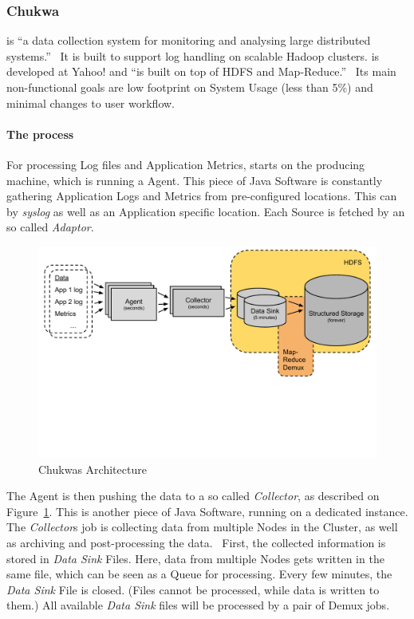 \subsubsection{Chukwa}
\chuklong is ``a data collection system for monitoring and analysing large distributed systems.''~\cite{Boulona}
It is built to support log handling on scalable Hadoop clusters. \chuk is developed at Yahoo! and ``is built on top of HDFS and Map-Reduce.''~\cite{Rabkin2008a}
Its main non-functional goals are low footprint on System Usage (less than 5\%) and minimal changes to user workflow.~\cite{Rabkin2010}

\paragraph{The process}
For processing Log files and Application Metrics, \chuk starts on the producing machine, which is running a \chuk Agent. 
This piece of Java Software is constantly gathering Application Logs and Metrics from pre-configured locations. 
This can by \textit{syslog} as well as an Application specific location. 
Each Source is fetched by an so called \textit{Adaptor}.~\cite{ChukwaAdminAgent}

\begin{figure}[hbt]
  \centering
  \includegraphics[width=\linewidth,clip=true,trim=0 6cm 0 0]{images/ChukwaArchitecture}
  \caption{Chukwas Architecture~\cite{Rabkin2008}}
  \label{fig:ChukwaArchitecture}
\end{figure}

The Agent is then pushing the data to a so called \textit{Collector}, as described on Figure~\ref{fig:ChukwaArchitecture}.
This is another piece of Java Software, running on a dedicated \chuk instance. 
The \textit{Collector}s job is collecting data from multiple Nodes in the Cluster, as well as archiving and post-processing the data.~\cite{Jose2014}
First, the collected information is stored in \textit{Data Sink} Files. 
Here, data from multiple Nodes gets written in the same file, which can be seen as a Queue for processing.
Every few minutes, the \textit{Data Sink} File is closed. (Files cannot be processed, while data is written to them.)
All available \textit{Data Sink} files will be processed by a pair of Demux \mr jobs.~\cite{Boulona} 


